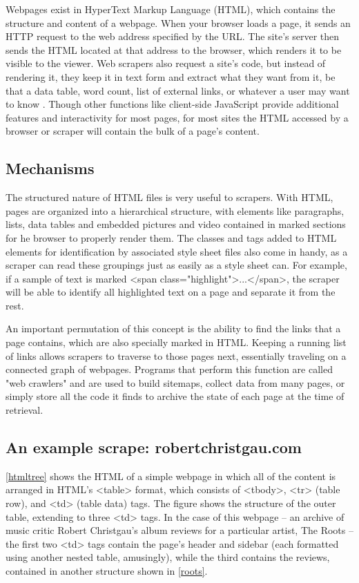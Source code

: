 Webpages exist in HyperText Markup Language (HTML), which contains the structure and content of a webpage. When your browser loads a page, it sends an HTTP request to the web address specified by the URL. The site's server then sends the HTML located at that address to the browser, which renders it to be visible to the viewer. Web scrapers also request a site's code, but instead of rendering it, they keep it in text form and extract what they want from it, be that a data table, word count, list of external links, or whatever a user may want to know \cite{mitchell_web_2015}. Though other functions like client-side JavaScript provide additional features and interactivity for most pages, for most sites the HTML accessed by a browser or scraper will contain the bulk of a page's content.

\subsection{Mechanisms}

The structured nature of HTML files is very useful to scrapers. With HTML, pages are organized into a hierarchical structure, with elements like paragraphs, lists, data tables and embedded pictures and video contained in marked sections for he browser to properly render them. The classes and tags added to HTML elements for identification by associated style sheet files also come in handy, as a scraper can read these groupings just as easily as a style sheet can. For example, if a sample of text is marked <span class="highlight">...</span>, the scraper will be able to identify all highlighted text on a page and separate it from the rest.

An important permutation of this concept is the ability to find the links that a page contains, which are also specially marked in HTML. Keeping a running list of links allows scrapers to traverse to those pages next, essentially traveling on a connected graph of webpages. Programs that perform this function are called "web crawlers" and are used to build sitemaps, collect data from many pages, or simply store all the code it finds to archive the state of each page at the time of retrieval.

\subsection{An example scrape: robertchristgau.com}

\autoref{htmltree} shows the HTML of a simple webpage in which all of the content is arranged in HTML's <table> format, which consists of <tbody>, <tr> (table row), and <td> (table data) tags. The figure shows the structure of the outer table, extending to three <td> tags. In the case of this webpage -- an archive of music critic Robert Christgau's album reviews for a particular artist, The Roots -- the first two <td> tags contain the page's header and sidebar (each formatted using another nested table, amusingly), while the third contains the reviews, contained in another structure shown in \autoref{roots}.

